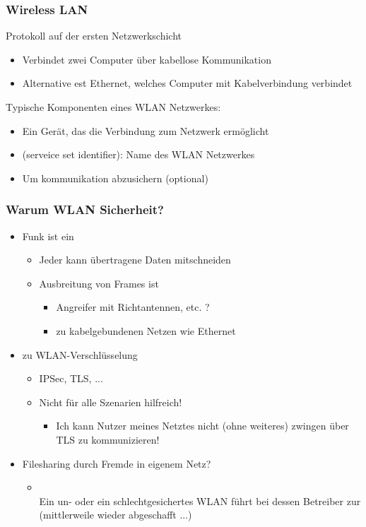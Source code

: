 \subsubsection*{Wireless LAN}
 Protokoll auf der ersten Netzwerkschicht
\begin{itemize}
    \item Verbindet zwei Computer über kabellose Kommunikation
    \item Alternative est Ethernet, welches Computer mit Kabelverbindung verbindet
\end{itemize}
Typische Komponenten eines WLAN Netzwerkes:
\begin{itemize}
    \item {} Ein Gerät, das die Verbindung zum Netzwerk ermöglicht
    \item {} (serveice set identifier): Name des WLAN Netzwerkes
    \item {} Um kommunikation abzusichern (optional)
\end{itemize}
\subsubsection*{Warum WLAN Sicherheit?}
\begin{itemize}
    \item Funk ist ein 
    \begin{itemize}
        \item Jeder  kann übertragene Daten mitschneiden
        \item Ausbreitung von Frames ist 
        \begin{itemize}
            \item Angreifer mit Richtantennen, etc. ?
            \item {} zu kabelgebundenen Netzen wie Ethernet
        \end{itemize}
    \end{itemize}
    \item {} zu WLAN-Verschlüsselung
    \begin{itemize}
        \item {} IPSec, TLS, ...
        \item {} Nicht für alle Szenarien hilfreich!
        \begin{itemize}
            \item Ich kann Nutzer meines Netztes nicht (ohne weiteres) zwingen über TLS zu kommunizieren!
        \end{itemize}
    \end{itemize}
    \item Filesharing durch Fremde in eigenem Netz?
    \begin{itemize}
        \item {}\\
        Ein un- oder ein schlechtgesichertes WLAN führt bei dessen Betreiber zur  (mittlerweile wieder abgeschafft ...)
    \end{itemize}
\end{itemize}
